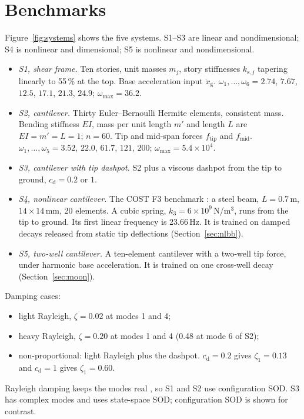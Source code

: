 \documentclass[preprint,12pt]{elsarticle}
\begin{document}
\section{Benchmarks}\label{sec:bench}
Figure~\ref{fig:systems} shows the five systems. S1--S3 are linear and nondimensional; S4 is nonlinear and dimensional; S5 is nonlinear and nondimensional.
\begin{itemize}
\item \emph{S1, shear frame.} Ten stories, unit masses $m_j$, story stiffnesses $k_{\mathrm s,j}$ tapering linearly to 55\,\% at the top. Base acceleration input $\ddot x_{\mathrm g}$. $\omega_1,\dots,\omega_6=2.74$, $7.67$, $12.5$, $17.1$, $21.3$, $24.9$; $\omega_{\max}=36.2$.
\item \emph{S2, cantilever.} Thirty Euler--Bernoulli Hermite elements, consistent mass. Bending stiffness $EI$, mass per unit length $m'$ and length $L$ are $EI=m'=L=1$; $n=60$. Tip and mid-span forces $f_{\mathrm{tip}}$ and $f_{\mathrm{mid}}$. $\omega_1,\dots,\omega_5=3.52$, $22.0$, $61.7$, $121$, $200$; $\omega_{\max}=5.4\times10^4$.
\item \emph{S3, cantilever with tip dashpot.} S2 plus a viscous dashpot from the tip to ground, $c_{\mathrm d}=0.2$ or $1$.
\item \emph{S4, nonlinear cantilever.} The COST F3 benchmark \citep[Sec.~4.4, Table~1]{Peeters2009}: a steel beam, $L=0.7$\,m, $14\times14$\,mm, 20 elements. A cubic spring, $k_3=6\times10^9$\,N/m$^3$, runs from the tip to ground. Its first linear frequency is 23.66\,Hz. It is trained on damped decays released from static tip deflections (Section~\ref{sec:nlbb}).
\item \emph{S5, two-well cantilever.} A ten-element cantilever with a two-well tip force, under harmonic base acceleration. It is trained on one cross-well decay (Section~\ref{sec:moon}).
\end{itemize}
Damping cases:
\begin{itemize}
\item light Rayleigh, $\zeta=0.02$ at modes 1 and 4;
\item heavy Rayleigh, $\zeta=0.20$ at modes 1 and 4 (0.48 at mode 6 of S2);
\item non-proportional: light Rayleigh plus the dashpot. $c_{\mathrm d}=0.2$ gives $\zeta_1=0.13$ and $c_{\mathrm d}=1$ gives $\zeta_1=0.60$.
\end{itemize}
Rayleigh damping keeps the modes real \citep{Caughey1965}, so S1 and S2 use configuration SOD. S3 has complex modes and uses state-space SOD; configuration SOD is shown for contrast.
\end{document}
